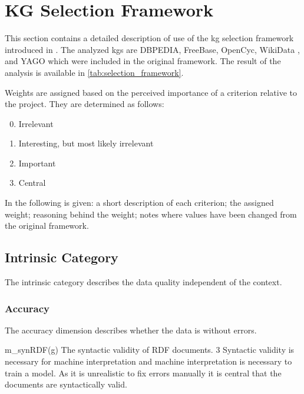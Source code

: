 \section{KG Selection Framework}
\label{app:kg_selection_framework}
\begingroup
\setlength\tabcolsep{0pt}
\titleformat{\subsubsection}[block]{\large\bfseries}{\thesubsubsection}{3mm}{}

This section contains a detailed description of use of the \gls{kg} selection framework introduced in \cite{farber2017dataquality}.
The analyzed \glspl{kg} are DBPEDIA, FreeBase, OpenCyc, WikiData \cite{vrandecic2014wikidata}, and YAGO \cite{mahdisoltani2015YAGO3} which were included in the original framework.
The result of the analysis is available in \autoref{tab:selection_framework}.



Weights are assigned based on the perceived importance of a criterion relative to the project. They are determined as follows:
\begin{enumerate}
    \setcounter{enumi}{-1}
    \item Irrelevant
    \item Interesting, but most likely irrelevant
    \item Important
    \item Central
\end{enumerate}

In the following is given: a short description of each criterion; the assigned weight; reasoning behind the weight; notes where values have been changed from the original framework.

\subsection{Intrinsic Category}
The intrinsic category describes the data quality independent of the context.

\subsubsection{Accuracy}
The accuracy dimension describes whether the data is without errors.


\weighttable
{m_{synRDF(g)}}
{The syntactic validity of RDF documents.}
{3}
{Syntactic validity is necessary for machine interpretation and machine interpretation is necessary to train a model. As it is unrealistic to fix errors manually it is central that the documents are syntactically valid.}
{}

